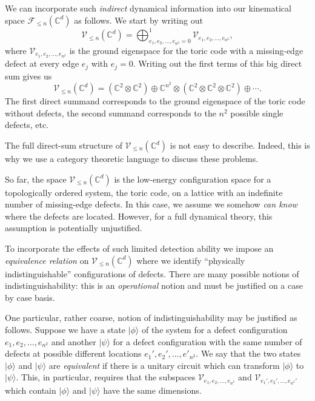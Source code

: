 \documentclass[aps,prb,twocolumn,superscriptaddress,noshowkeys]{revtex4-2}  %
\theoremstyle{plain}%
\theoremstyle{definition}
\theoremstyle{remark}
\begin{document}
We can incorporate such \emph{indirect} dynamical information into our kinematical space $\mathcal{F}_{\le n}(\mathbb{C}^d)$ as follows. We start by writing out 
\begin{equation}
\mathcal{V}_{\le n}(\mathbb{C}^d) = \bigoplus_{e_1,e_2, \ldots, e_{n^2} =0}^1 \mathcal{V}_{e_1,e_2,\ldots, e_{n^2}},
\end{equation}
where $\mathcal{V}_{e_1,e_2,\ldots, e_{n^2}}$ is the ground eigenspace for the toric code with a missing-edge defect at every edge $e_j$ with $e_j=0$. Writing out the first terms of this big direct sum gives us
\begin{equation}
\mathcal{V}_{\le n}(\mathbb{C}^d) = (\mathbb{C}^2\otimes \mathbb{C}^2)\oplus \mathbb{C}^{n^2}\otimes (\mathbb{C}^2\otimes \mathbb{C}^2\otimes \mathbb{C}^2)\oplus \cdots.
\end{equation}
The first direct summand corresponds to the ground eigenspace of the toric code without defects, the second summand corresponds to the $n^2$ possible single defects, etc.

The full direct-sum structure of $\mathcal{V}_{\le n}(\mathbb{C}^d)$ is not easy to describe. Indeed, this is why we use a category theoretic language to discuss these problems. 

So far, the space $\mathcal{V}_{\le n}(\mathbb{C}^d)$ is the low-energy configuration space for a topologically ordered system, the toric code, on a lattice with an indefinite number of missing-edge defects. In this case, we assume we somehow \emph{can know} where the defects are located. However, for a full dynamical theory, this assumption is potentially unjustified.

To incorporate the effects of such limited detection ability we impose an \emph{equivalence relation} on $\mathcal{V}_{\le n}(\mathbb{C}^d)$ where we identify ``physically indistinguishable'' configurations of defects. There are many possible notions of indistinguishability: this is an \emph{operational} notion and must be justified on a case by case basis. 

One particular, rather coarse, notion of indistinguishability may be justified as follows. Suppose we have a state $|\phi\rangle$ of the system for a defect configuration $e_1,e_2, \ldots, e_{n^2}$ and another $|\psi\rangle$ for a defect configuration with the same number of defects at possible different locations $e_1',e_2',\ldots, e'_{n^2}$. We say that the two states $|\phi\rangle$ and $|\psi\rangle$ are \emph{equivalent} if there is a unitary circuit which can transform $|\phi\rangle$ to $|\psi\rangle$. This, in particular, requires that the subspaces $\mathcal{V}_{e_1,e_2,\ldots,e_{n^2}}$ and $\mathcal{V}_{e_1',e_2',\ldots,e_{n^2}'}$ which contain $|\phi\rangle$ and $|\psi\rangle$ have the same dimensions.
\end{document}
